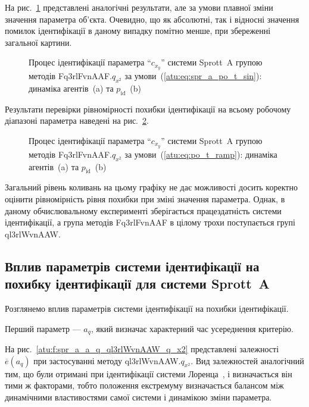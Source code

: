 На рис.~\ref{atu:f:spr_a_id_Fq3rlFvnAAF_q_x2_sin} представлені аналогічні
результати, але за умови плавної зміни значення параметра
об'єкта. Очевидно, що як абсолютні, так і відносні значення
помилок ідентифікації в даному випадку помітно менше, при
збереженні загальної картини. %

\begin{figure}[htb!]
  \caption{Процес ідентифікації параметра ``$c_{x_y}$'' системи Sprott~A групою методів Fq3rlFvnAAF.$q_{x^2}$ за умови~(\ref{atu:eq:spr_a_po_t_sin}): динаміка агентів~(a) та $p_\mathrm{id}$~(b)}
  \label{atu:f:spr_a_id_Fq3rlFvnAAF_q_x2_sin}
\end{figure}

Результати перевірки рівномірності похибки ідентифікації
на всьому робочому діапазоні параметра наведені на
рис.~\ref{atu:f:spr_a_id_Fq3rlFvnAAF_q_x2_ramp}.


\begin{figure}[htb!]
  \caption{Процес ідентифікації параметра ``$c_{x_y}$'' системи Sprott~A групою методів Fq3rlFvnAAF.$q_{x^2}$ за умови~(\ref{atu:eq:po_t_ramp}): динаміка агентів~(a) та $p_\mathrm{id}$~(b)}
  \label{atu:f:spr_a_id_Fq3rlFvnAAF_q_x2_ramp}
\end{figure}

Загальний рівень коливань на цьому графіку не дає можливості
досить коректно оцінити рівномірність рівня похибки при
зміні значення параметра. Однак, в даному обчислювальному
експерименті зберігається працездатність системи
ідентифікації, а група методів Fq3rlFvnAAF в цілому трохи
поступається групі ql3rlWvnAAW.




\subsection{Вплив параметрів системи ідентифікації на похибку ідентифікації для системи Sprott~A} %


Розглянемо вплив параметрів системи ідентифікації на похибки
ідентифікації.

Перший параметр ---
$a_q$, який визначає характерний час усереднення критерію.

На рис.~\ref{atu:f:spr_a_a_q_ql3rlWvnAAW_q_x2} представлені залежності
$\overline{e} (a_q)$ при застосуванні методу ql3rlWvnAAW.$q_{x^2}$.
Вид залежностей аналогічний тим, що були отримані при
ідентифікації системи Лоренца~\cite{atu_kher2015}, і визначається він
тими ж факторами, тобто положення екстремуму визначається
балансом між динамічними властивостями самої системи і
динамікою зміни параметра.


